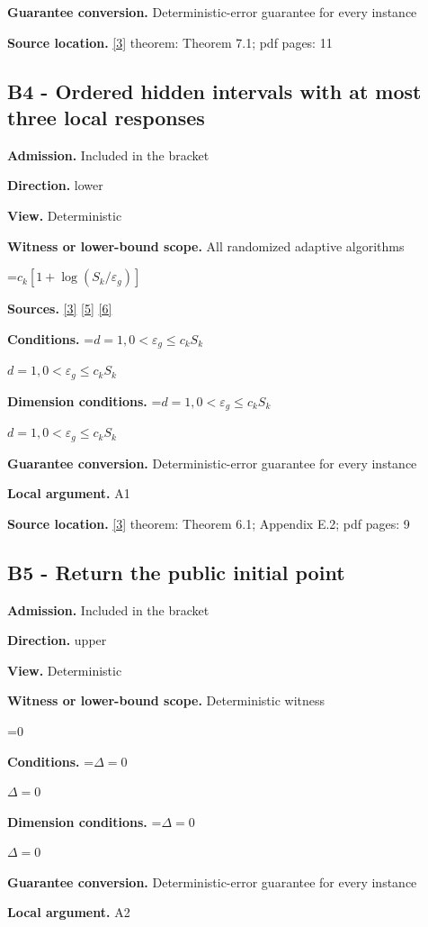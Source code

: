 \documentclass[10pt,a4paper]{article}
\newcommand{\AtlasMath}[1]{\par\begingroup\centering\setbox0=\hbox{$\displaystyle #1$}\ifdim\wd0>1.4\linewidth\typeout{ATLAS WIDE FORMULA: \the\wd0}\fi\ifdim\wd0>\linewidth\resizebox{\linewidth}{!}{\box0}\else\box0\fi\par\endgroup}
\newcommand{\AtlasInlineMath}[1]{\begingroup\setbox0=\hbox{$#1$}\ifdim\wd0>.4\linewidth\endgroup\AtlasMath{#1}\else\endgroup$#1$\fi}
\begin{document}
\textbf{Guarantee conversion.} Deterministic-error guarantee for every instance

\textbf{Source location.} \href{https://arxiv.org/abs/2610.16295}{[3]} theorem: Theorem 7.1; pdf pages: 11

\subsection{B4 - Ordered hidden intervals with at most three local responses}
\textbf{Admission.} Included in the bracket

\textbf{Direction.} lower

\textbf{View.} Deterministic

\textbf{Witness or lower-bound scope.} All randomized adaptive algorithms

\AtlasMath{c_k[1+\log(S_k/\varepsilon_g)]}
\textbf{Sources.} \href{https://arxiv.org/abs/2610.16295}{[3]} \href{https://arxiv.org/abs/1710.11606v3}{[5]} \href{https://arxiv.org/abs/1811.01220}{[6]}

\textbf{Conditions.} \AtlasInlineMath{d=1, 0<\varepsilon_g\le c_k S_k}

\textbf{Dimension conditions.} \AtlasInlineMath{d=1, 0<\varepsilon_g\le c_k S_k}

\textbf{Guarantee conversion.} Deterministic-error guarantee for every instance

\textbf{Local argument.} A1

\textbf{Source location.} \href{https://arxiv.org/abs/2610.16295}{[3]} theorem: Theorem 6.1; Appendix E.2; pdf pages: 9

\subsection{B5 - Return the public initial point}
\textbf{Admission.} Included in the bracket

\textbf{Direction.} upper

\textbf{View.} Deterministic

\textbf{Witness or lower-bound scope.} Deterministic witness

\AtlasMath{0}
\textbf{Conditions.} \AtlasInlineMath{\Delta=0}

\textbf{Dimension conditions.} \AtlasInlineMath{\Delta=0}

\textbf{Guarantee conversion.} Deterministic-error guarantee for every instance

\textbf{Local argument.} A2
\end{document}
